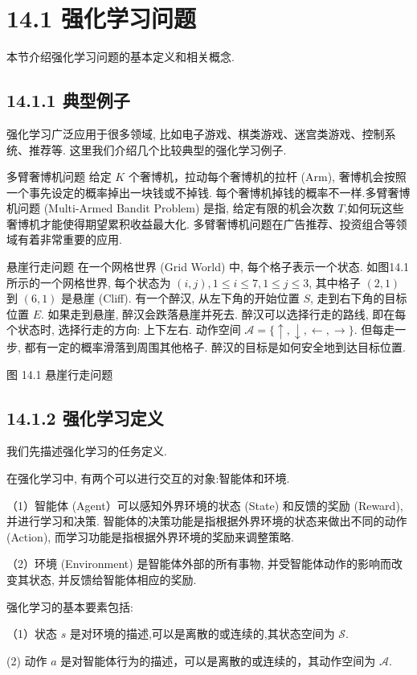 \documentclass[10pt]{article}
\begin{document}
\section*{14.1 强化学习问题}
本节介绍强化学习问题的基本定义和相关概念.

\subsection*{14.1.1 典型例子}
强化学习广泛应用于很多领域, 比如电子游戏、棋类游戏、迷宫类游戏、控制系统、推荐等. 这里我们介绍几个比较典型的强化学习例子.

多臂奢博机问题 给定 $K$ 个奢博机，拉动每个奢博机的拉杆 (Arm), 奢博机会按照一个事先设定的概率掉出一块钱或不掉钱. 每个奢博机掉钱的概率不一样.多臂奢博机问题 (Multi-Armed Bandit Problem) 是指, 给定有限的机会次数 $T$,如何玩这些奢博机才能使得期望累积收益最大化. 多臂奢博机问题在广告推荐、投资组合等领域有着非常重要的应用.

悬崖行走问题 在一个网格世界 (Grid World) 中, 每个格子表示一个状态. 如图14.1所示的一个网格世界, 每个状态为 $(i, j), 1 \leq i \leq 7,1 \leq j \leq 3$, 其中格子 $(2,1)$ 到 $(6,1)$ 是悬崖 (Cliff). 有一个醉汉, 从左下角的开始位置 $S$, 走到右下角的目标位置 $E$. 如果走到悬崖, 醉汉会跌落悬崖并死去. 醉汉可以选择行走的路线, 即在每个状态时, 选择行走的方向: 上下左右. 动作空间 $\mathcal{A}=\{\uparrow, \downarrow, \leftarrow, \rightarrow\}$. 但每走一步, 都有一定的概率滑落到周围其他格子. 醉汉的目标是如何安全地到达目标位置.



图 14.1 悬崖行走问题

\subsection*{14.1.2 强化学习定义}
我们先描述强化学习的任务定义.

在强化学习中, 有两个可以进行交互的对象:智能体和环境.

（1）智能体 (Agent）可以感知外界环境的状态 (State) 和反馈的奖励 (Reward), 并进行学习和决策. 智能体的决策功能是指根据外界环境的状态来做出不同的动作 (Action), 而学习功能是指根据外界环境的奖励来调整策略.

（2）环境 (Environment) 是智能体外部的所有事物, 并受智能体动作的影响而改变其状态, 并反馈给智能体相应的奖励.

强化学习的基本要素包括:

（1）状态 $s$ 是对环境的描述,可以是离散的或连续的,其状态空间为 $\mathcal{S}$.

(2) 动作 $a$ 是对智能体行为的描述，可以是离散的或连续的，其动作空间为 $\mathcal{A}$.
\end{document}
